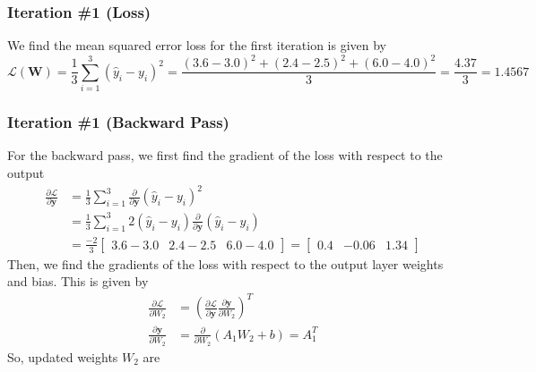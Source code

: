 \documentclass[12pt]{article}
\begin{document}
    \subsubsection*{Iteration \#1 (Loss)}
    We find the mean squared error loss for the first iteration is given by
    \begin{equation}
        \mathcal{L}(\mathbf{W}) = \frac{1}{3} \sum_{i=1}^{3} (\hat{y}_{i} - y_{i})^{2} = \frac{(3.6 - 3.0)^{2} + (2.4 - 2.5)^{2} + (6.0 - 4.0)^{2}}{3} = \frac{4.37}{3} = 1.4567
    \end{equation}

    \subsubsection*{Iteration \#1 (Backward Pass)}
    For the backward pass, we first find the gradient of the loss with respect to the output
    \begin{align*}
        \frac{\partial \mathcal{L}}{\partial \mathbf{y}} &= \frac{1}{3} \sum_{i=1}^{3} \frac{\partial}{\partial \mathbf{y}} (\hat{y}_{i} - y_{i})^{2} \\
        &= \frac{1}{3} \sum_{i=1}^{3} 2 (\hat{y}_{i} - y_{i}) \frac{\partial}{\partial \mathbf{y}} (\hat{y}_{i} - y_{i}) \\
        &= \frac{-2}{3} \begin{bmatrix}
            3.6 - 3.0 & 2.4 - 2.5 & 6.0 - 4.0
        \end{bmatrix} = \begin{bmatrix}
            0.4 & -0.06 & 1.34
        \end{bmatrix}
    \end{align*}
    Then, we find the gradients of the loss with respect to the output layer weights
    and bias. This is given by
    \begin{align*}
        \frac{\partial \mathcal{L}}{\partial W_{2}} &= \left( \frac{\partial \mathcal{L}}{\partial \mathbf{y}} \frac{\partial \mathbf{y}}{\partial W_{2}} \right)^{T} \\
        \frac{\partial \mathbf{y}}{\partial W_{2}} &= \frac{\partial}{\partial W_{2}} (A_{1} W_{2} + b) = A_{1}^{T}
    \end{align*}
    So, updated weights $W_{2}$ are
\end{document}
